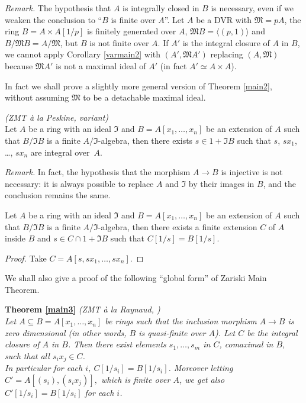 \documentclass[11pt,a4paper,twoside]{article}
\newcommand{\gothic}{\mathfrak}
\newcommand{\fI}{{\gothic I}}
\newcommand{\fM}{{\gothic M}}
\newcommand\gen[1]{{\langle #1 \rangle}}
\newcommand\In {\mathrm{I}_n}
\begin{document}
\noindent \emph{Remark.}
The hypothesis that $A$ is integrally closed in $B$ is necessary, even if we weaken the conclusion to ``$B$ is finite over $A$''.
Let $A$ be a DVR with $\fM=pA$, the ring $B=A\times A[1/p]$ is finitely generated over $A$, $\fM B=\gen{(p,1)}$ and $B/\fM B=A/\fM$, but $B$ is not finite over $A$.
If $A'$ is the integral closure of $A$ in $B$, we cannot apply Corollary
\ref{varmain2} with $(A',\fM A')$ replacing $(A,\fM)$ because $\fM A'$
 is not a maximal ideal of $A'$ (in fact $A'\simeq A\times A$).


\medskip 
In fact we shall prove a slightly more general version
of Theorem \ref{main2}, without assuming $\fM$
to be a detachable maximal ideal.

\begin{theorem}\label{main2bis}\emph{(ZMT \`a la Peskine, variant)}\\
Let $A$ be a ring with an ideal $\fI$
and $B=A[x_1,\dots,x_n]$ be an extension of $A$ such that $B/\fI B$ is a finite $A/\fI$-algebra,  then there exists $s\in 1+\fI B$ such that
$s$, $sx_1$, \dots, $sx_n$ are integral over~$A$.
\end{theorem}

\noindent \emph{Remark.} In fact, the hypothesis that the morphism $A\to B$ is injective is not necessary: it is always possible to replace $A$ and $\fI$ by their images in $B$, and the conclusion remains the same. 

\begin{corollary} \label{cormain2bis}
Let $A$ be a ring with an ideal $\fI$
and $B=A[x_1,\dots,x_n]$ be an extension of $A$  such that $B/\fI B$ 
is a finite $A/\fI$-algebra,  then there exists  a 
finite extension $C$ of $A$ inside $B$ and $s\in C\cap 1+\fI B$ such that $C[1/s]=B[1/s]$. 
\end{corollary}
%
\begin{proof}
Take $C=A[s,sx_1,\dots,sx_{n}]$.
\end{proof}
%

We shall also give a proof of the following ``global form'' of Zariski Main Theorem. 


\medskip\noindent  
{\bf Theorem \ref{main3}} 
{\it  \emph{(ZMT \`a la Raynaud, \cite{Ray})}\\
Let $A\subseteq B = A[x_1,\dots,x_n]$ be rings  
 such that the inclusion morphism $A\to B$ is zero dimensional
 (in other words, $B$ is quasi-finite over $A$).
Let $C$ be the integral closure of $A$ in $B$.
Then  there exist elements $s_1,\dots,s_m$ in $C$, comaximal in $B$, such that
all  $s_ix_j\in C$. 
\\In particular for each $i$, $C[1/s_i]=B[1/s_i]$. 
Moreover  letting $C'=A[(s_i),(s_ix_j)],$ which is finite over $A$,
 we get also  $C'[1/s_i]=B[1/s_i]$ for each $i$.
}
\end{document}
